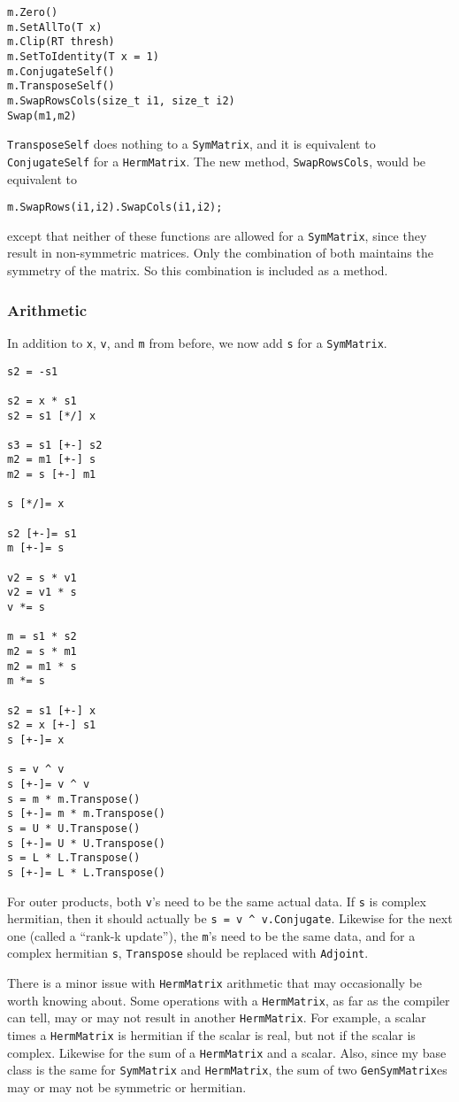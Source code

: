 \documentclass[twoside,letterpaper,11pt]{article}
\renewcommand{\tt}[1]{{\texttt {#1}}}
\begin{document}
\begin{verbatim}
m.Zero()
m.SetAllTo(T x)
m.Clip(RT thresh)
m.SetToIdentity(T x = 1)
m.ConjugateSelf()
m.TransposeSelf()
m.SwapRowsCols(size_t i1, size_t i2)
Swap(m1,m2)
\end{verbatim}
\tt{TransposeSelf} does nothing to a \tt{SymMatrix}, and it is equivalent to
\tt{ConjugateSelf} for a \tt{HermMatrix}.
The new method, \tt{SwapRowsCols}, would be equivalent to 
\begin{verbatim}
m.SwapRows(i1,i2).SwapCols(i1,i2);
\end{verbatim}
except that neither of these functions are allowed for a \tt{SymMatrix}, since 
they result in non-symmetric matrices.  Only the combination of both
maintains the symmetry of the matrix.  So this combination is included as
a method.

\subsubsection{Arithmetic}
\label{symarith}

In addition to \tt{x}, \tt{v}, and \tt{m} from before,
we now add \tt{s} for a \tt{SymMatrix}.

\begin{verbatim}
s2 = -s1

s2 = x * s1
s2 = s1 [*/] x

s3 = s1 [+-] s2
m2 = m1 [+-] s
m2 = s [+-] m1

s [*/]= x

s2 [+-]= s1
m [+-]= s

v2 = s * v1
v2 = v1 * s
v *= s

m = s1 * s2
m2 = s * m1
m2 = m1 * s
m *= s

s2 = s1 [+-] x
s2 = x [+-] s1
s [+-]= x

s = v ^ v
s [+-]= v ^ v
s = m * m.Transpose()
s [+-]= m * m.Transpose()
s = U * U.Transpose()
s [+-]= U * U.Transpose()
s = L * L.Transpose()
s [+-]= L * L.Transpose()
\end{verbatim}
For outer products, both \tt{v}'s need to be the same actual data.  If \tt{s}
is complex hermitian, then it should actually be \tt{s = v \^{} v.Conjugate}.
Likewise for the next one (called a ``rank-k update''), the \tt{m}'s need to be the
same data, and for a complex hermitian \tt{s}, \tt{Transpose}
should be replaced with \tt{Adjoint}.

There is a minor issue with \tt{HermMatrix} arithmetic that may occasionally be
worth knowing about.
Some operations with a \tt{HermMatrix}, as far as the compiler can tell, may or may
not result in another \tt{HermMatrix}.  For example, a scalar times a \tt{HermMatrix}
is hermitian if the scalar is real, but not if the scalar is complex.
Likewise for the sum of a \tt{HermMatrix} and a scalar.
Also, since my base class is the same for \tt{SymMatrix} and \tt{HermMatrix},
the sum of two \tt{GenSymMatrix}es may or may not be symmetric or 
hermitian.
\end{document}

